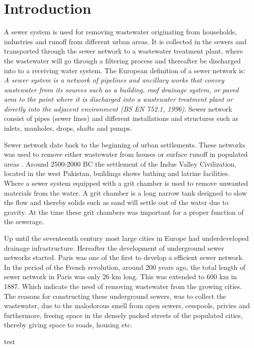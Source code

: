 \chapter{Introduction}
\label{ch:introduction}
A sewer system is used for removing wastewater originating from households, industries and runoff from different urban areas. It is collected in the sewers and transported through the sewer network to a wastewater treatment plant, where the wastewater will go through a filtering process and thereafter be discharged into to a receiving water system. The European definition of a sewer network is: \textit{A sewer system is a network of pipelines and ancillary works that convey wastewater from its sources such as a building, roof drainage system, or paved area to the point where it is discharged into a wastewater treatment plant or directly into the adjacent environment (BS EN 752.1, 1996)}. Sewer network consist of pipes (sewer lines) and different installations and structures such as inlets, manholes, drops, shafts and pumps.

Sewer network date back to the beginning of urban settlements. These networks was used to remove either wastewater from houses or surface runoff in populated areas . Around 2500-2000 BC the settlement of the Indus Valley Civilization, located in the west Pakistan, buildings shows bathing and latrine facilities. Where a sewer system equipped with a grit chamber is used to remove unwanted materials from the water. A grit chamber is a long narrow tank designed to slow the flow and thereby solids such as sand will settle out of the water due to gravity. At the time these grit chambers was important for a proper function of the sewerage.

Up until the seventeenth century most large cities in Europe had underdeveloped drainage infrastructure. Hereafter the development of underground sewer networks started. Paris was one of the first to develop a efficient sewer network. In the period of the French revolution, around 200 years ago, the total length of sewer network in Paris was only 26 km long. This was extended to 600 km in 1887. Which indicate the need of removing wastewater from the growing cities. The reasons for constructing these underground sewers, was to collect the wastewater, due to the malodorous smell from open sewers, cesspools, privies and furthermore, freeing space in the densely packed streets of the populated cities, thereby giving space to roads, housing etc.

test
